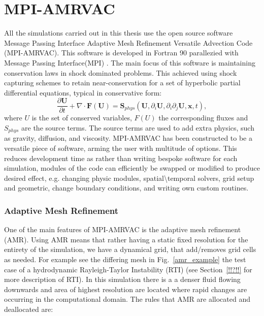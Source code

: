 \section{MPI-AMRVAC}
All the simulations carried out in this thesis use the open source software Message Passing Interface Adaptive Mesh Refinement Versatile Advection Code (MPI-AMRVAC). This software is developed in Fortran 90 parallezied with Message Passing Interface(MPI) \citep{toth1996ApLC34245T,Keppens_2012,Porth_2014,Xia_2017}. The main focus of this software is maintaining conservation laws in shock dominated problems. This achieved using shock capturing schemes to retain near-conservation for a set of hyperbolic partial differential equations, typical in conservative form: 
\begin{equation}\label{AMRVAC_stlye}
\frac{\partial \boldsymbol{U}}{\partial t} + \nabla \cdot \boldsymbol{F}(\boldsymbol{U}) = \boldsymbol{S}_{phys} (\boldsymbol{U}, \partial_{i} \boldsymbol{U}, \partial_i \partial_j \boldsymbol{U},\boldsymbol{x},t) ,
\end{equation}
where $U$ is the set of conserved variables, $F(U)$ the corresponding fluxes and $S_{phys}$ are the source terms. The source terms are used to add extra physics, such as gravity, diffusion, and viscosity. \np
%
MPI-AMRVAC has been constructed to be a versatile piece of software, arming the user with multitude of options. This reduces development time as rather than writing bespoke software for each simulation, modules of the code can efficiently be swapped or modified to produce desired effect, e.g. changing physic modules, spatial\textbackslash temporal solvers, grid setup and geometric, change boundary conditions, and writing own custom routines. \np
% 
\subsubsection{Adaptive Mesh Refinement}
One of the main features of MPI-AMRVAC is the adaptive mesh refinement (AMR). Using AMR means that rather having a static fixed resolution for the entirety of the simulation, we have a dynamical grid, that add/removes grid cells as needed. For example see the differing mesh in Fig.~\ref{amr_example} the test case of a hydrodynamic Rayleigh-Taylor Instability (RTI) (see Section~\ref{!!?!!} for more description of RTI). In this simulation there is a a denser fluid flowing downwards and area of highest resolution are located where rapid changes are occurring in the computational domain. The rules that AMR are allocated and deallocated are:     


